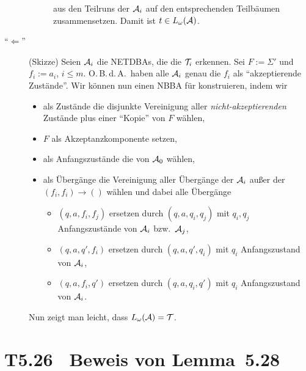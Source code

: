 \documentclass[fontsize=11pt, twoside=false, numbers=autoenddot]{scrbook}
\begin{document}
\begin{description}
\begin{description}
        aus den Teilruns der $\mathcal{A}_i$
        auf den entsprechenden Teilbäumen zusammensetzen. Damit ist $t \in L_\omega(\mathcal{A})$.
    \end{description}
  \item[{\boldmath "`$\Leftarrow$"'}] (Skizze)
    Seien $\mathcal{A}_i$ die NETDBAs, die die $\mathcal{T}_i$ erkennen.
    Sei $F := \Sigma'$ und $f_i := a_i$, $i \leq m$.
    O.\,B.\,d.\,A.\ haben alle $\mathcal{A}_i$ genau die $f_i$ als "`akzeptierende Zustände"'.
    Wir können nun einen NBBA \Amc für \Tmc konstruieren, indem wir
    \begin{itemize}
      \item 
        als Zustände die disjunkte Vereinigung aller \emph{nicht-akzeptierenden} Zustände
        plus einer "`Kopie"' von $F$ wählen,
      \item
        $F$ als Akzeptanzkomponente setzen,
      \item
        als Anfangszustände die von $\mathcal{A}_0$ wählen,
      \item
        als Übergänge die Vereinigung aller Übergänge der $\mathcal{A}_i$
        außer der $(f_i,f_i) \to ()$ wählen
        und dabei alle Übergänge
        \begin{itemize}
          \item 
            $(q,a,f_i,f_j)$ ersetzen durch $(q,a,q_i,q_j)$ mit $q_i,q_j$ Anfangszustände von $\mathcal{A}_i$ bzw.\ $\mathcal{A}_j$,
          \item 
            $(q,a,q',f_i)$ ersetzen durch $(q,a,q',q_i)$ mit $q_i$ Anfangszustand von $\mathcal{A}_i$,
          \item 
            $(q,a,f_i,q')$ ersetzen durch $(q,a,q_i,q')$ mit $q_i$ Anfangszustand von $\mathcal{A}_i$.
        \end{itemize}
    \end{itemize}
    Nun zeigt man leicht, dass $L_\omega(\mathcal{A}) = \mathcal{T}$.
    \qedhere
\end{description}

\section*{T5.26~ Beweis von Lemma~5.28}
\end{document}
